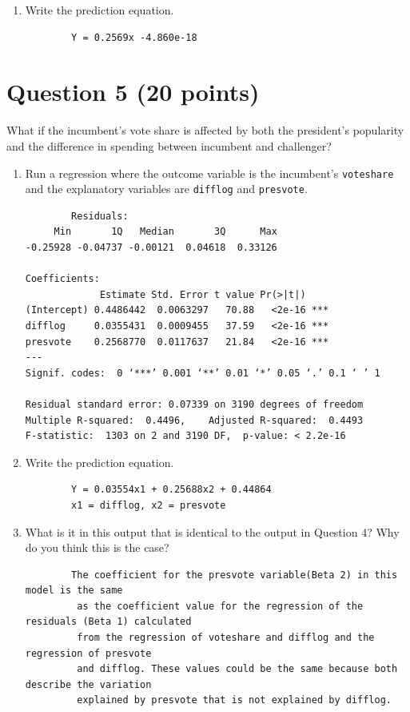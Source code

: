 \documentclass[12pt,letterpaper]{article}
\begin{document}
\begin{enumerate}
		\item Write the prediction equation.
	\begin{verbatim}
		Y = 0.2569x -4.860e-18
	\end{verbatim}
	\end{enumerate}
	
	\newpage	

\section*{Question 5 (20 points)}
\noindent What if the incumbent's vote share is affected by both the president's popularity and the difference in spending between incumbent and challenger? 
	\begin{enumerate}
		\item Run a regression where the outcome variable is the incumbent's \texttt{voteshare} and the explanatory variables are \texttt{difflog} and \texttt{presvote}.
			
		\begin{verbatim}
		Residuals:
     Min       1Q   Median       3Q      Max 
-0.25928 -0.04737 -0.00121  0.04618  0.33126 

Coefficients:
             Estimate Std. Error t value Pr(>|t|)    
(Intercept) 0.4486442  0.0063297   70.88   <2e-16 ***
difflog     0.0355431  0.0009455   37.59   <2e-16 ***
presvote    0.2568770  0.0117637   21.84   <2e-16 ***
---
Signif. codes:  0 ‘***’ 0.001 ‘**’ 0.01 ‘*’ 0.05 ‘.’ 0.1 ‘ ’ 1

Residual standard error: 0.07339 on 3190 degrees of freedom
Multiple R-squared:  0.4496,	Adjusted R-squared:  0.4493 
F-statistic:  1303 on 2 and 3190 DF,  p-value: < 2.2e-16
		\end{verbatim}
		
		\item Write the prediction equation.
		\begin{verbatim}
		Y = 0.03554x1 + 0.25688x2 + 0.44864
		x1 = difflog, x2 = presvote
		\end{verbatim}
		
		\item What is it in this output that is identical to the output in Question 4? Why do you think this is the case?	\vspace{5cm}
		\begin{verbatim}
		The coefficient for the presvote variable(Beta 2) in this model is the same
		 as the coefficient value for the regression of the residuals (Beta 1) calculated 
		 from the regression of voteshare and difflog and the regression of presvote 
		 and difflog. These values could be the same because both describe the variation 
		 explained by presvote that is not explained by difflog. 
		
		\end{verbatim}
	\end{enumerate}
\end{document}
